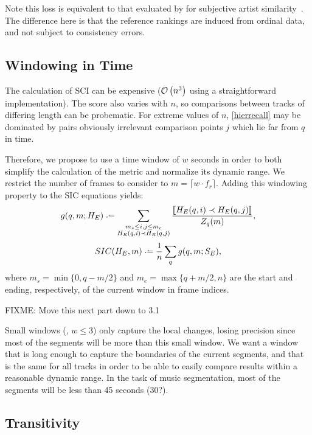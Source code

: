 \documentclass{article}
\begin{document}
Note this loss is equivalent to that evaluated by for subjective artist similarity~\cite{mcfee2011}.
The difference here is that the reference rankings are induced from ordinal data, and not subject to consistency errors.

\subsection{Windowing in Time}

The calculation of SCI can be expensive ($\mathcal{O}\left(n^3\right)$ using a straightforward 
implementation).
The score also varies with $n$, so comparisons between tracks of differing length can
be probematic.  For extreme values of $n$, \cref{hierrecall} may be dominated by pairs
obviously irrelevant comparison points $j$ which lie far from $q$ in time.

Therefore, we propose to use a time window of $w$ seconds in order to both simplify the 
calculation of the metric and normalize its dynamic range.
We restrict the number of frames to consider to $m = \lceil w \cdot f_r \rceil$.
Adding this windowing property to the SIC equations yields:
\begin{equation}
  g(q, m ; H_E) \defeq \sum_{\substack{
  m_s \leq i,j \leq m_e \\ 
  H_R(q, i) \prec H_R(q, j) }} \frac{\ind{H_E(q, i) \prec H_E(q,
  j)}}{Z_q(m)},\label{windowrecall}
\end{equation}
\begin{equation}
SIC(H_E,m) \defeq \frac{1}{n} \sum_q g(q,m ; S_E),
\end{equation}
where $m_s = \min\{0,q-m/2\}$ and $m_e = \max\{q+m/2,n\}$ are the start and ending, respectively, of the current window in frame indices.

FIXME: Move this next part down to 3.1

Small windows (\eg, $w \leq 3$) only capture the local changes, 
losing precision since most of the segments will be more than this small window.
We want a window that is long enough to capture the boundaries of the current segments, and that is the same for all tracks in order to be able to easily compare results within a reasonable dynamic range.
In the task of music segmentation, most of the segments will be less than 45 seconds (30?).

\subsection{Transitivity}
\end{document}
